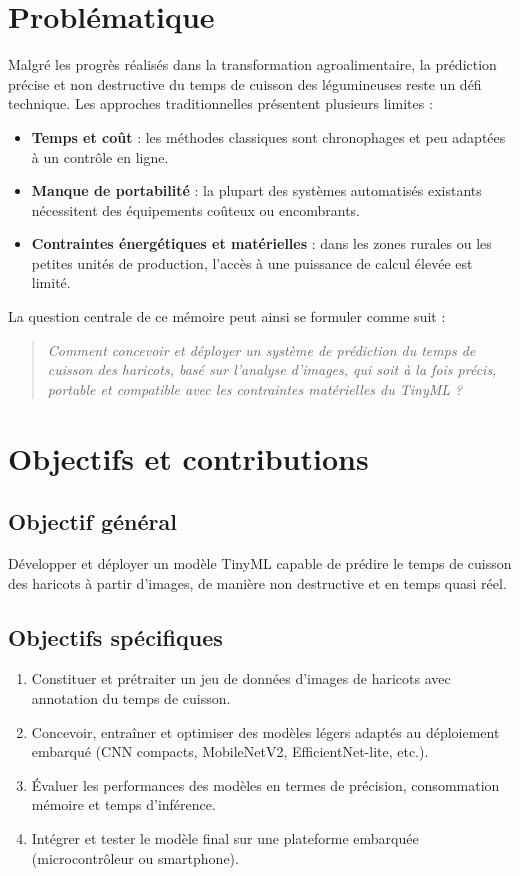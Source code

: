\section{Problématique}
Malgré les progrès réalisés dans la transformation agroalimentaire, la prédiction précise et non destructive du temps de cuisson des légumineuses reste un défi technique. Les approches traditionnelles présentent plusieurs limites :
\begin{itemize}
    \item \textbf{Temps et coût} : les méthodes classiques sont chronophages et peu adaptées à un contrôle en ligne.
    \item \textbf{Manque de portabilité} : la plupart des systèmes automatisés existants nécessitent des équipements coûteux ou encombrants.
    \item \textbf{Contraintes énergétiques et matérielles} : dans les zones rurales ou les petites unités de production, l’accès à une puissance de calcul élevée est limité.
\end{itemize}

La question centrale de ce mémoire peut ainsi se formuler comme suit :
\begin{quote}
\textit{Comment concevoir et déployer un système de prédiction du temps de cuisson des haricots, basé sur l’analyse d’images, qui soit à la fois précis, portable et compatible avec les contraintes matérielles du TinyML ?}
\end{quote}

\section{Objectifs et contributions}

\subsection{Objectif général}
Développer et déployer un modèle TinyML capable de prédire le temps de cuisson des haricots à partir d’images, de manière non destructive et en temps quasi réel.

\subsection{Objectifs spécifiques}
\begin{enumerate}
    \item Constituer et prétraiter un jeu de données d’images de haricots avec annotation du temps de cuisson.
    \item Concevoir, entraîner et optimiser des modèles légers adaptés au déploiement embarqué (CNN compacts, MobileNetV2, EfficientNet-lite, etc.).
    \item Évaluer les performances des modèles en termes de précision, consommation mémoire et temps d’inférence.
    \item Intégrer et tester le modèle final sur une plateforme embarquée (microcontrôleur ou smartphone).
\end{enumerate}

